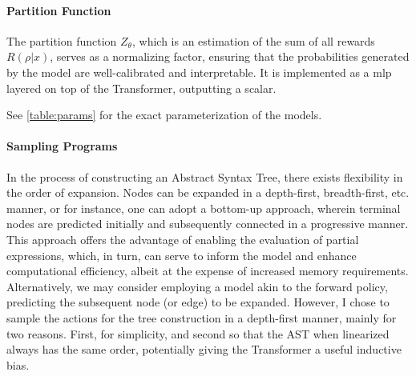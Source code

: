 \paragraph*{Partition Function}
The partition function $Z_\theta$, which is an estimation of the sum of all rewards $R(\rho|x)$, serves as a normalizing factor, ensuring that the probabilities generated by the model are well-calibrated and interpretable. It is implemented as a \acrshort{mlp} layered on top of the Transformer, outputting a scalar.

See \autoref{table:params} for the exact parameterization of the models.

\paragraph*{Sampling Programs}\label{sec:sampling_programs}
In the process of constructing an Abstract Syntax Tree, there exists flexibility in the order of expansion. Nodes can be expanded in a depth-first, breadth-first, etc. manner, or for instance, one can adopt a bottom-up approach, wherein terminal nodes are predicted initially and subsequently connected in a progressive manner. This approach offers the advantage of enabling the evaluation of partial expressions, which, in turn, can serve to inform the model and enhance computational efficiency, albeit at the expense of increased memory requirements. Alternatively, we may consider employing a model akin to the forward policy, predicting the subsequent node (or edge) to be expanded.
However, I chose to sample the actions for the tree construction in a depth-first manner, mainly for two reasons. 
First, for simplicity, and second so that the AST when linearized always has the same order, potentially giving the Transformer a useful inductive bias.

